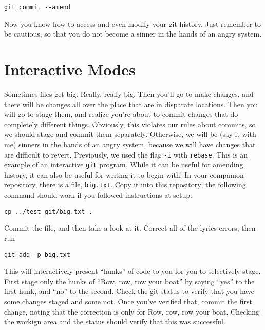 {\begin{verbatim}
git commit --amend
\end{verbatim}

\par{
Now you know how to access and even modify your git history. Just remember to
be cautious, so that you do not become a sinner in the hands of an angry
system.
}

\section{Interactive Modes}

\par{
Sometimes files get big. Really, really big. Then you'll go to make changes,
and there will be changes all over the place that are in disparate locations.
Then you will go to stage them, and realize you're about to commit changes
that do completely different things. Obviously, this violates our rules about
commits, so we should stage and commit them separately. Otherwise, we will be
(say it with me) sinners in the hands of an angry system, because we will have
changes that are difficult to revert. Previously, we used the flag \verb+-i+
with \verb+rebase+. This is an example of an interactive \verb+git+ program.
While it can be useful for amending history, it can also be useful for writing
it to begin with! In your companion repository, there is a file,
\verb+big.txt+. Copy it into this repository; the following command should
work if you followed instructions at setup:
}

\begin{verbatim}
cp ../test_git/big.txt .
\end{verbatim}

\par{
Commit the file, and then take a look at it. Correct all of the lyrics errors,
then run
}

\begin{verbatim}
git add -p big.txt
\end{verbatim}

\par{
This will interactively present ``hunks'' of code to you for you to
selectively stage. First stage only the hunks of ``Row, row, row your boat''
by saying ``yes'' to the first hunk, and ``no'' to the second. Check the git
status to verify that you have some changes staged and some not. Once you've
verified that, commit the first change, noting that the correction is only for
Row, row, row your boat. Checking the workign area and the status should
verify that this was successful. 
}

}
